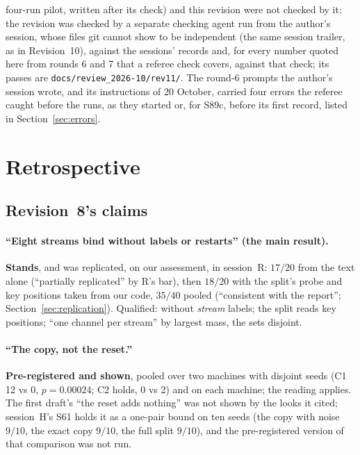 \documentclass[11pt]{article}
\begin{document}
four-run pilot, written after its check) and this revision were not checked by it: the revision was checked by a separate checking agent run from the author's session, whose files git cannot show to be independent (the same session trailer, as in Revision~10), against the sessions' records and, for every number quoted here from rounds 6 and 7 that a referee check covers, against that check; its passes are \texttt{docs/review\_2026-10/rev11/}. The round-6 prompts the author's session wrote, and its instructions of 20 October, carried four errors the referee caught before the runs, as they started or, for S89c, before its first record, listed in Section~\ref{sec:errors}.

\section{Retrospective}
\label{sec:retro}

\subsection{Revision~8's claims}

\paragraph{``Eight streams bind without labels or restarts'' (the main result).} \textbf{Stands}, and was replicated, on our assessment, in session~R: $17/20$ from the text alone (``partially replicated'' by R's bar), then $18/20$ with the split's probe and key positions taken from our code, $35/40$ pooled (``consistent with the report''; Section~\ref{sec:replication}). Qualified: without \emph{stream} labels; the split reads key positions; ``one channel per stream'' by largest mass, the sets disjoint.

\paragraph{``The copy, not the reset.''} \textbf{Pre-registered and shown}, pooled over two machines with disjoint seeds (C1 12 vs 0, $p = 0.00024$; C2 holds, 0 vs 2) and on each machine; the reading applies. The first draft's ``the reset adds nothing'' was not shown by the looks it cited; session~H's S61 holds it as a one-pair bound on ten seeds (the copy with noise $9/10$, the exact copy $9/10$, the full split $9/10$), and the pre-registered version of that comparison was not run.
\end{document}
